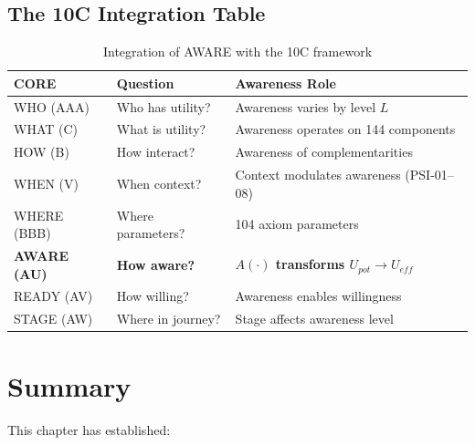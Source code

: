 \subsection{The 10C Integration Table}

\begin{table}[h]
\centering
\begin{tabular}{lll}
\toprule
\textbf{CORE} & \textbf{Question} & \textbf{Awareness Role} \\
\midrule
WHO (AAA) & Who has utility? & Awareness varies by level $L$ \\
WHAT (C) & What is utility? & Awareness operates on 144 components \\
HOW (B) & How interact? & Awareness of complementarities \\
WHEN (V) & When context? & Context modulates awareness (PSI-01--08) \\
WHERE (BBB) & Where parameters? & 104 axiom parameters \\
\textbf{AWARE (AU)} & \textbf{How aware?} & \textbf{$A(\cdot)$ transforms $U_{pot} \to U_{eff}$} \\
READY (AV) & How willing? & Awareness enables willingness \\
STAGE (AW) & Where in journey? & Stage affects awareness level \\
\bottomrule
\end{tabular}
\caption{Integration of AWARE with the 10C framework}
\label{tab:10c-aware-integration}
\end{table}



\section{Summary}
\label{subsec:11-21-summary}





This chapter has established:

